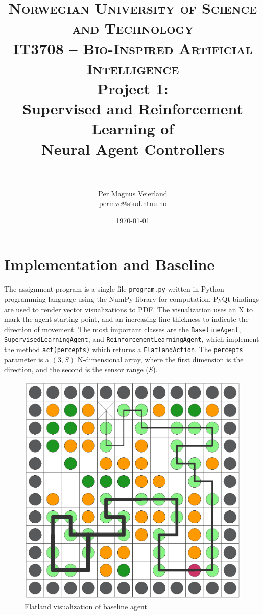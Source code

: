 \documentclass[paper=a4, fontsize=10pt]{scrartcl}
\title{
\normalfont \normalsize
\textsc{Norwegian University of Science and Technology\\IT3708 -- Bio-Inspired Artificial Intelligence}
\horrule{0.5pt} \\[0.4cm]
\huge Project 1:\\ Supervised and Reinforcement Learning of\\Neural Agent Controllers\\
\horrule{2pt} \\[0.5cm]
}
\author{Per Magnus Veierland\\permve@stud.ntnu.no}
\date{\normalsize\today}
\begin{document}
\maketitle

\section*{Implementation and Baseline}

The assignment program is a single file \texttt{program.py} written in Python programming language using the NumPy library for computation. PyQt bindings are used to render vector visualizations to PDF. The visualization uses an \textsc{X} to mark the agent starting point, and an increasing line thickness to indicate the direction of movement. The most important classes are the \texttt{BaselineAgent}, \texttt{SupervisedLearningAgent}, and \texttt{ReinforcementLearningAgent}, which implement the method \texttt{act(percepts)} which returns a \texttt{FlatlandAction}. The \texttt{percepts} parameter is a $(3,S)$ N-dimensional array, where the first dimension is the direction, and the second is the sensor range ($S$).

\begin{figure}
\centering
\includegraphics[scale=0.2]{../data/render-baseline.pdf}
\caption{Flatland visualization of baseline agent}
\label{figure:flatland_baseline}
\end{figure}
\end{document}
